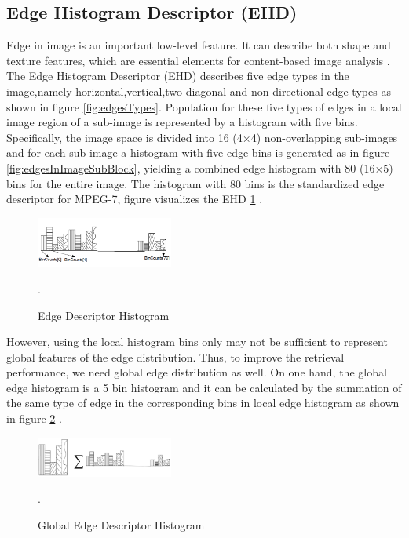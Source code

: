 \documentclass[11pt]{article}
\begin{document}
\subsection{Edge Histogram Descriptor (EHD)}
Edge in image is an important low-level feature. It can describe both shape and texture features, which are essential elements for content-based image analysis \cite{won2004feature, balasubramani2009efficient}. The Edge Histogram Descriptor (EHD) describes ﬁve edge types in the image,namely horizontal,vertical,two diagonal and non-directional edge types as shown in figure \ref{fig:edgesTypes}. Population for these ﬁve types of edges in a local image region of a sub-image is represented by a histogram with ﬁve bins. Speciﬁcally, the image space is divided into 16 (4×4) non-overlapping sub-images and for each sub-image a histogram with ﬁve edge bins is generated as in figure \ref{fig:edgesInImageSubBlock}, yielding a combined edge histogram with 80 (16×5) bins for the entire image. The histogram with 80 bins is the standardized edge descriptor for MPEG-7, figure visualizes the EHD \ref{fig:EDH} \cite{won2002efficient, won2004feature, lisin2005combining, park2000efficient}.


\begin{figure}[h]
\centering
\includegraphics[width=0.4\textwidth]{EDH}
\caption{Edge Descriptor Histogram }.
\label{fig:EDH}
\end{figure}

However, using the local histogram bins only may not be sufficient to represent global features of the edge distribution. Thus, to improve the retrieval performance, we need global edge distribution as well. On one hand, the global edge histogram is a 5 bin histogram and it can be calculated by the summation of the same type of edge in the corresponding bins in local edge histogram as shown in figure \ref{fig:globalEDH} \cite{won2002efficient, won2004feature, lisin2005combining, park2000efficient}.

\begin{figure}[th]
\centering
\includegraphics[width=0.4\textwidth]{globalEDH}
\caption{Global Edge Descriptor Histogram}.
\label{fig:globalEDH}
\end{figure}
\end{document}
